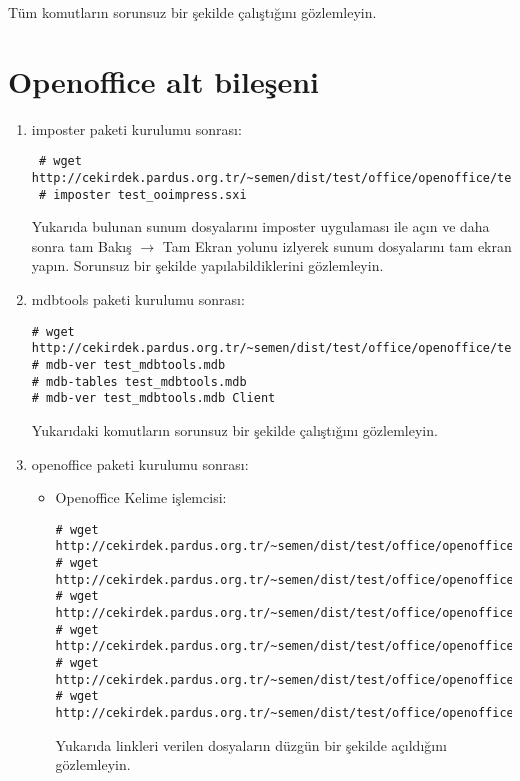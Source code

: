 \documentclass[a4paper,10pt]{article}
\begin{document}
\begin{enumerate}
\begin{verbatim}
\end{verbatim}

Tüm komutların sorunsuz bir şekilde çalıştığını gözlemleyin.


\end{enumerate}
\section{Openoffice alt bileşeni}
\begin{enumerate}
 \item imposter paketi kurulumu sonrası:
\begin{verbatim}
 # wget http://cekirdek.pardus.org.tr/~semen/dist/test/office/openoffice/test_ooimpress.sxi
 # imposter test_ooimpress.sxi
\end{verbatim}
Yukarıda bulunan sunum dosyalarını imposter uygulaması ile açın ve daha sonra tam Bakış $\rightarrow$ Tam Ekran yolunu izlyerek sunum dosyalarını tam ekran yapın. Sorunsuz bir şekilde yapılabildiklerini gözlemleyin.

 \item mdbtools paketi kurulumu sonrası:
\begin{verbatim}
# wget http://cekirdek.pardus.org.tr/~semen/dist/test/office/openoffice/test_mdbtools.mdb
# mdb-ver test_mdbtools.mdb
# mdb-tables test_mdbtools.mdb
# mdb-ver test_mdbtools.mdb Client
\end{verbatim}

Yukarıdaki komutların sorunsuz bir şekilde çalıştığını gözlemleyin.

\item openoffice paketi kurulumu sonrası:
\begin{itemize}
\item Openoffice Kelime işlemcisi:
\begin{verbatim}
# wget http://cekirdek.pardus.org.tr/~semen/dist/test/office/openoffice/test_oowriter.doc
# wget http://cekirdek.pardus.org.tr/~semen/dist/test/office/openoffice/test_oowriter.odt
# wget http://cekirdek.pardus.org.tr/~semen/dist/test/office/openoffice/test_oowriter.sxw
# wget http://cekirdek.pardus.org.tr/~semen/dist/test/office/openoffice/test_oowriter.txt
# wget http://cekirdek.pardus.org.tr/~semen/dist/test/office/openoffice/test_oowriter.ott
# wget http://cekirdek.pardus.org.tr/~semen/dist/test/office/openoffice/test_oowriter.html
\end{verbatim}

Yukarıda linkleri verilen dosyaların düzgün bir şekilde açıldığını gözlemleyin.


\end{itemize}
\end{enumerate}
\end{document}

